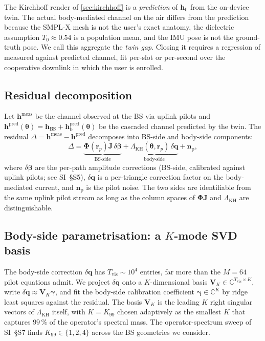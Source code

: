 \documentclass[journal,twocolumn,10pt]{IEEEtran}
\theoremstyle{plain}
\theoremstyle{definition}
\theoremstyle{remark}
\newcommand{\rr}{\mathbf{r}}
\newcommand{\hh}{\bm{h}}
\newcommand{\Jmat}{\mathbf{J}}
\newcommand{\Phimat}{\mathbf{\Phi}}
\newcommand{\thetab}{\bm{\theta}}
\newcommand{\betab}{\bm{\beta}}
\newcommand{\gammab}{\bm{\gamma}}
\newcommand{\hBS}{\bm{h}_{\mathrm{BS}}}
\newcommand{\hbody}{\bm{h}_{\mathrm{b}}}
\newcommand{\Tepskin}{T_{0}}
\newcommand{\Complex}{\mathbb{C}}
\begin{document}
The Kirchhoff render of \cref{sec:kirchhoff} is a \emph{prediction}
of $\hbody$ from the on-device twin. The actual body-mediated channel
on the air differs from the prediction because the SMPL-X mesh is
not the user's exact anatomy, the dielectric assumption $\Tepskin
\approx 0.54$ is a population mean, and the IMU pose is not the
ground-truth pose. We call this aggregate the \emph{twin gap}.
Closing it requires a regression of measured against predicted
channel, fit per-slot or per-second over the cooperative downlink
in which the user is enrolled.

\subsection{Residual decomposition}

Let $\hh^{\mathrm{meas}}$ be the channel observed at the BS via
uplink pilots and $\hh^{\mathrm{pred}}(\thetab) =
\hBS + \hbody^{\mathrm{pred}}(\thetab)$ be the cascaded channel
predicted by the twin. The residual $\Delta = \hh^{\mathrm{meas}} -
\hh^{\mathrm{pred}}$ decomposes into BS-side and body-side
components:
\begin{equation}\label{eq:residual}
\Delta = \underbrace{\Phimat(\rr_p)\Jmat\,\delta\betab}_{\text{BS-side}}
+ \underbrace{\Lambda_{\mathrm{KH}}(\thetab,\rr_p)\,\delta\bm{q}}_{\text{body-side}}
+ \bm{n}_{\mathrm{p}},
\end{equation}
where $\delta\betab$ are the per-path amplitude corrections
(BS-side, calibrated against uplink pilots; see SI~\S{}S5),
$\delta\bm{q}$ is a
per-triangle correction factor on the body-mediated current, and
$\bm{n}_{\mathrm{p}}$ is the pilot noise. The two sides are
identifiable from the same uplink pilot stream as long as the
column spaces of $\Phimat\Jmat$ and $\Lambda_{\mathrm{KH}}$ are
distinguishable.

\subsection{Body-side parametrisation: a $K$-mode SVD basis}

The body-side correction $\delta\bm{q}$ has $T_{\mathrm{vis}} \sim
10^{4}$ entries, far more than the $M = 64$ pilot equations admit.
We project $\delta\bm{q}$ onto a $K$-dimensional basis
$\bm{V}_K \in \Complex^{T_{\mathrm{vis}}\times K}$, write
$\delta\bm{q} \approx \bm{V}_K \gammab$, and fit the body-side
calibration coefficient $\gammab \in \Complex^{K}$ by ridge least
squares against the residual. The basis $\bm{V}_K$ is the leading
$K$ right singular vectors of $\Lambda_{\mathrm{KH}}$ itself, with
$K = K_{99}$ chosen adaptively as the smallest $K$ that captures
$99\,\%$ of the operator's spectral mass. The operator-spectrum
sweep of SI~\S{}S7 finds $K_{99} \in \{1, 2, 4\}$ across the BS
geometries we consider.
\end{document}
